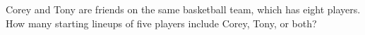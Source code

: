 Corey and Tony are friends on the same basketball team, which has eight players. How many starting lineups of five players include Corey, Tony, or both?
